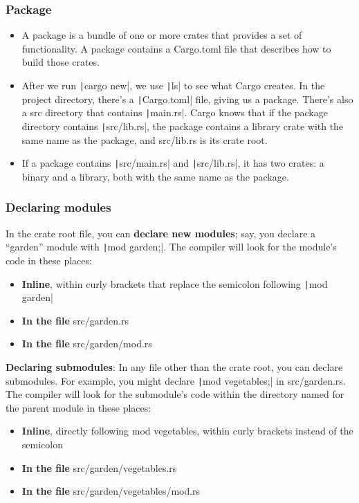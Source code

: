 \documentclass{beamer}
\begin{document}
\begin{frame}[fragile]
	\frametitle{Package}
	\begin{itemize}
		\item A package is a bundle of one or more crates that provides a set of functionality. A package contains a Cargo.toml file that describes how to build those crates.
		\item 	After we run \texttt|cargo new|, we use \texttt|ls| to see what Cargo creates. In the project directory, there’s a \texttt|Cargo.toml| file, giving us a package. There’s also a src directory that contains \texttt|main.rs|. Cargo knows that if the package directory contains \texttt|src/lib.rs|, the package contains a library crate with the same name as the package, and src/lib.rs is its crate root.
		\item If a package contains \texttt|src/main.rs| and \texttt|src/lib.rs|, it has two crates: a binary and a library, both with the same name as the package. 
	\end{itemize}
\end{frame}

\begin{frame}[fragile]
	\frametitle{Declaring modules}
	In the crate root file, you can \textbf{declare new modules}; say, you declare a “garden” module with  \texttt|mod garden;|. The compiler will look for the module’s code in these places:
	\begin{itemize}
		\item 	\textbf{Inline}, within curly brackets that replace the semicolon following \texttt|mod garden|
		\item 	\textbf{In the file} src/garden.rs
		\item 	\textbf{In the file} src/garden/mod.rs
	\end{itemize}
	
	\textbf{Declaring submodules}: In any file other than the crate root, you can declare submodules. For example, you might declare \texttt|mod vegetables;| in src/garden.rs. The compiler will look for the submodule’s code within the directory named for the parent module in these places:
	\begin{itemize}
		\item 	\textbf{Inline}, directly following mod vegetables, within curly brackets instead of the semicolon
		\item 	\textbf{In the file} src/garden/vegetables.rs
		\item 	\textbf{In the file} src/garden/vegetables/mod.rs
	\end{itemize}
	
\end{frame}
\end{document}
